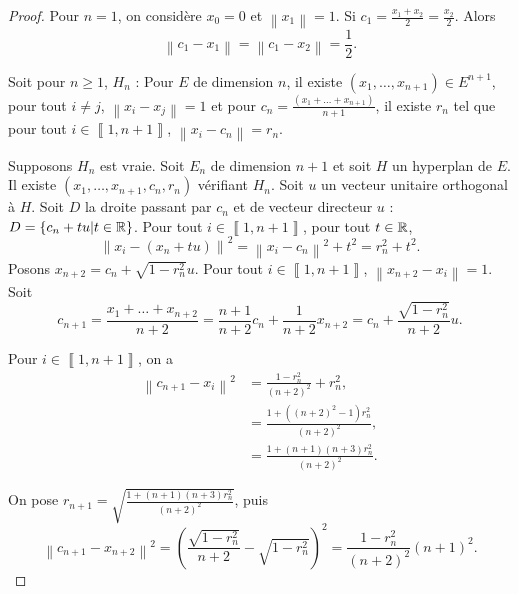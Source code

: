 \documentclass[12pt]{article}
\begin{document}
\begin{proof}
	Pour $n=1$, on considère $x_0=0$ et $\left\lVert x_1\right\rVert=1$. Si $c_1=\frac{x_1+x_2}{2}=\frac{x_2}{2}$. Alors 
	\begin{equation}
		\left\lVert c_1-x_1\right\rVert=\left\lVert c_1-x_2\right\rVert=\frac{1}{2}.
	\end{equation}

	Soit pour $n\geqslant1$, $H_n$ : \og Pour $E$ de dimension $n$, il existe $(x_1,\dots,x_{n+1})\in E^{n+1}$, pour tout $i\neq j$, $\left\lVert x_i-x_j\right\rVert=1$ et pour $c_n=\frac{(x_1+\dots+x_{n+1})}{n+1}$, il existe $r_n$ tel que pour tout $i\in\left\llbracket1,n+1\right\rrbracket$, $\left\lVert x_i-c_n\right\rVert=r_n$\fg.

	Supposons $H_n$ est vraie. Soit $E_n$ de dimension $n+1$ et soit $H$ un hyperplan de $E$. Il existe $(x_1,\dots,x_{n+1},c_n,r_n)$ vérifiant $H_n$. Soit $u$ un vecteur unitaire orthogonal à $H$. Soit $D$ la droite passant par $c_n$ et de vecteur directeur $u$ : $D=\left\lbrace c_n+tu\middle| t\in\mathbb{R}\right\rbrace$. Pour tout $i\in\left\llbracket1,n+1\right\rrbracket$, pour tout $t\in\mathbb{R}$, 
	\begin{equation}
		\left\lVert x_i-(x_n+tu)\right\rVert^{2}=\left\lVert x_i-c_n\right\rVert^{2}+t^{2}=r_n^{2}+t^{2}.
	\end{equation}
	Posons $x_{n+2}=c_n+\sqrt{1-r_n^{2}}u$. Pour tout $i\in\left\llbracket 1,n+1\right\rrbracket$, $\left\lVert x_{n+2}-x_i\right\rVert=1$. Soit 
	\begin{equation}
		c_{n+1}=\frac{x_1+\dots+x_{n+2}}{n+2}=\frac{n+1}{n+2}c_n+\frac{1}{n+2}x_{n+2}=c_n+\frac{\sqrt{1-r_n^{2}}}{n+2}u.
	\end{equation}

	Pour $i\in\left\llbracket1,n+1\right\rrbracket$, on a 
	\begin{align}
		\left\lVert c_{n+1}-x_{i}\right\rVert^{2}
		&=\frac{1-r_n^{2}}{(n+2)^{2}}+r_n^{2},\\
		&=\frac{1+((n+2)^{2}-1)r_n^{2}}{(n+2)^{2}},\\
		&=\frac{1+(n+1)(n+3)r_n^{2}}{(n+2)^{2}}.
	\end{align}

	On pose $r_{n+1}=\sqrt{\frac{1+(n+1)(n+3)r_n^{2}}{(n+2)^{2}}}$, puis 
	\begin{equation}
		\left\lVert c_{n+1}-x_{n+2}\right\rVert^{2}=\left(\frac{\sqrt{1-r_n^{2}}}{n+2}-\sqrt{1-r_n^{2}}\right)^{2}=\frac{1-r_n^{2}}{(n+2)^{2}}(n+1)^{2}.
	\end{equation}


\end{proof}
\end{document}
